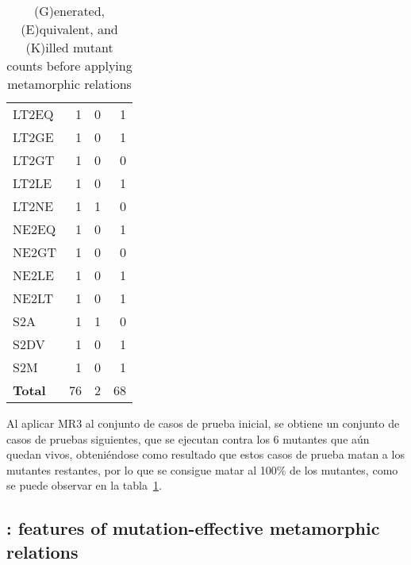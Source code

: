 \begin{table}
\begin{tabular}{lrrr}
LT2EQ   &       1       &       0       &       1       \\
LT2GE   &       1       &       0       &       1       \\
LT2GT   &       1       &       0       &       0       \\
LT2LE   &       1       &       0       &       1       \\
LT2NE   &       1       &       1       &       0       \\
NE2EQ   &       1       &       0       &       1       \\
NE2GT   &       1       &       0       &       0       \\
NE2LE   &       1       &       0       &       1       \\
NE2LT   &       1       &       0       &       1       \\
S2A         &   1       &       1       &       0       \\
S2DV    &       1       &       0       &       1       \\
S2M         &   1       &       0       &       1       \\

    \midrule
    \textbf{Total} & 76 & 2 & 68 \\
    \bottomrule
    \end{tabular}
    \caption{(G)enerated, (E)quivalent, and (K)illed mutant counts before applying metamorphic relations}
    \label{tab:mutant-counts}
\end{table}


Al aplicar MR3 al conjunto de casos de prueba inicial, se obtiene un conjunto de casos de pruebas siguientes, que se ejecutan contra los 6 mutantes que aún quedan vivos, obteniéndose como resultado que estos casos de prueba matan a los mutantes restantes, por lo que se consigue matar al 100\% de los mutantes, como se puede observar en la tabla~\ref{tab:mutant-counts}.

\subsection{\rqidentifying: features of mutation-effective metamorphic relations}

